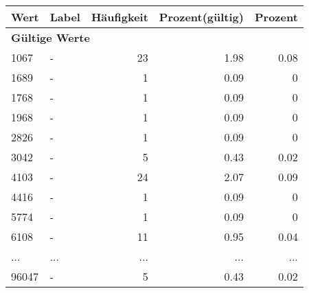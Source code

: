      \begin{longtable}{lXrrr}
     \toprule
     \textbf{Wert} & \textbf{Label} & \textbf{Häufigkeit} & \textbf{Prozent(gültig)} & \textbf{Prozent} \\
     \endhead
     \midrule
     \multicolumn{5}{l}{\textbf{Gültige Werte}}\\
        1067 & \multicolumn{1}{X}{-} & %
          \num{23} &
          \num[round-mode=places,round-precision=2]{1,98} &
          \num[round-mode=places,round-precision=2]{0,08} \\
        1689 & \multicolumn{1}{X}{-} & %
          \num{1} &
          \num[round-mode=places,round-precision=2]{0,09} &
          \num[round-mode=places,round-precision=2]{0} \\
        1768 & \multicolumn{1}{X}{-} & %
          \num{1} &
          \num[round-mode=places,round-precision=2]{0,09} &
          \num[round-mode=places,round-precision=2]{0} \\
        1968 & \multicolumn{1}{X}{-} & %
          \num{1} &
          \num[round-mode=places,round-precision=2]{0,09} &
          \num[round-mode=places,round-precision=2]{0} \\
        2826 & \multicolumn{1}{X}{-} & %
          \num{1} &
          \num[round-mode=places,round-precision=2]{0,09} &
          \num[round-mode=places,round-precision=2]{0} \\
        3042 & \multicolumn{1}{X}{-} & %
          \num{5} &
          \num[round-mode=places,round-precision=2]{0,43} &
          \num[round-mode=places,round-precision=2]{0,02} \\
        4103 & \multicolumn{1}{X}{-} & %
          \num{24} &
          \num[round-mode=places,round-precision=2]{2,07} &
          \num[round-mode=places,round-precision=2]{0,09} \\
        4416 & \multicolumn{1}{X}{-} & %
          \num{1} &
          \num[round-mode=places,round-precision=2]{0,09} &
          \num[round-mode=places,round-precision=2]{0} \\
        5774 & \multicolumn{1}{X}{-} & %
          \num{1} &
          \num[round-mode=places,round-precision=2]{0,09} &
          \num[round-mode=places,round-precision=2]{0} \\
        6108 & \multicolumn{1}{X}{-} & %
          \num{11} &
          \num[round-mode=places,round-precision=2]{0,95} &
          \num[round-mode=places,round-precision=2]{0,04} \\
       ... & ... & ... & ... & ... \\
        96047 & \multicolumn{1}{X}{-} & %
          \num{5} &
          \num[round-mode=places,round-precision=2]{0,43} &
          \num[round-mode=places,round-precision=2]{0,02} \\


\end{longtable}
